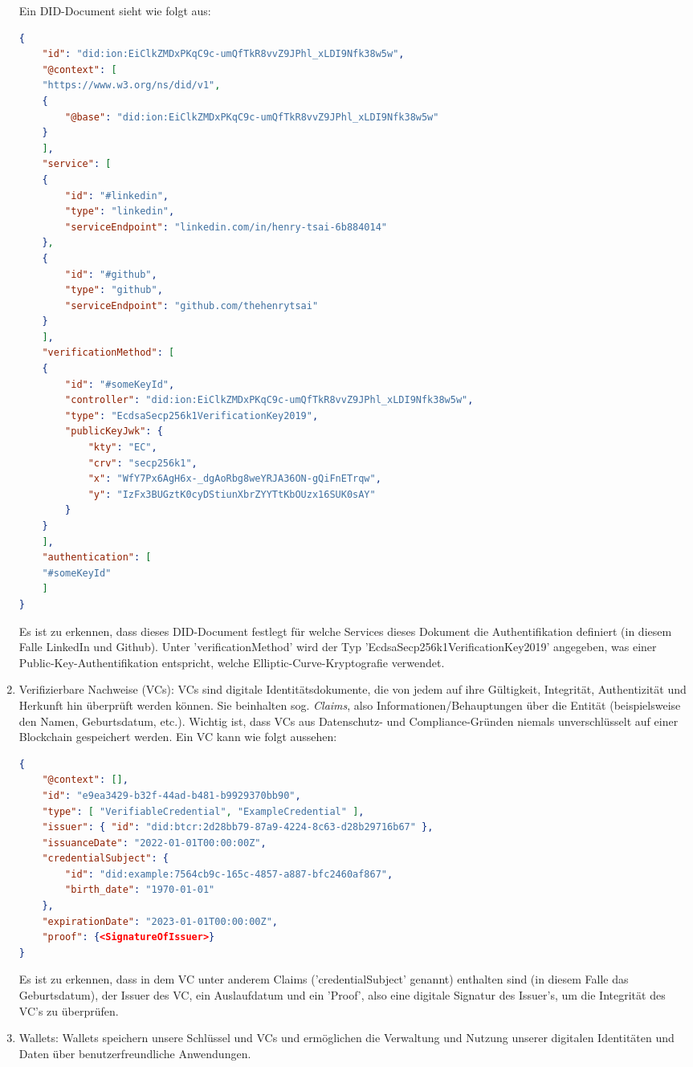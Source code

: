 \begin{enumerate}
	Ein DID-Document sieht wie folgt aus:
	\begin{lstlisting}[language=json,firstnumber=1]	
{
	"id": "did:ion:EiClkZMDxPKqC9c-umQfTkR8vvZ9JPhl_xLDI9Nfk38w5w",
	"@context": [
	"https://www.w3.org/ns/did/v1",
	{
		"@base": "did:ion:EiClkZMDxPKqC9c-umQfTkR8vvZ9JPhl_xLDI9Nfk38w5w"
	}
	],
	"service": [
	{
		"id": "#linkedin",
		"type": "linkedin",
		"serviceEndpoint": "linkedin.com/in/henry-tsai-6b884014"
	},
	{
		"id": "#github",
		"type": "github",
		"serviceEndpoint": "github.com/thehenrytsai"
	}
	],
	"verificationMethod": [
	{
		"id": "#someKeyId",
		"controller": "did:ion:EiClkZMDxPKqC9c-umQfTkR8vvZ9JPhl_xLDI9Nfk38w5w",
		"type": "EcdsaSecp256k1VerificationKey2019",
		"publicKeyJwk": {
			"kty": "EC",
			"crv": "secp256k1",
			"x": "WfY7Px6AgH6x-_dgAoRbg8weYRJA36ON-gQiFnETrqw",
			"y": "IzFx3BUGztK0cyDStiunXbrZYYTtKbOUzx16SUK0sAY"
		}
	}
	],
	"authentication": [
	"#someKeyId"
	]
}
	\end{lstlisting}
	
	Es ist zu erkennen, dass dieses DID-Document festlegt für welche Services dieses Dokument die Authentifikation definiert (in diesem Falle LinkedIn und Github). Unter 'verificationMethod' wird der Typ 'EcdsaSecp256k1VerificationKey2019' angegeben, was einer Public-Key-Authentifikation entspricht, welche Elliptic-Curve-Kryptografie verwendet.
	
	\item Verifizierbare Nachweise (VCs): VCs sind digitale Identitätsdokumente, die von jedem auf ihre Gültigkeit, Integrität, Authentizität und Herkunft hin überprüft werden können. Sie beinhalten sog. \textsl{Claims}, also Informationen/Behauptungen über die Entität (beispielsweise den Namen, Geburtsdatum, etc.). Wichtig ist, dass VCs aus Datenschutz- und Compliance-Gründen niemals unverschlüsselt auf einer Blockchain gespeichert werden. Ein VC kann wie folgt aussehen:
	
	\begin{lstlisting}[language=json,firstnumber=1]
{
	"@context": [],
	"id": "e9ea3429-b32f-44ad-b481-b9929370bb90",
	"type": [ "VerifiableCredential", "ExampleCredential" ],
	"issuer": { "id": "did:btcr:2d28bb79-87a9-4224-8c63-d28b29716b67" },
	"issuanceDate": "2022-01-01T00:00:00Z",
	"credentialSubject": {
		"id": "did:example:7564cb9c-165c-4857-a887-bfc2460af867",
		"birth_date": "1970-01-01"
	},
	"expirationDate": "2023-01-01T00:00:00Z",
	"proof": {<SignatureOfIssuer>}
}
	\end{lstlisting}
	
	Es ist zu erkennen, dass in dem VC unter anderem Claims ('credentialSubject' genannt) enthalten sind (in diesem Falle das Geburtsdatum), der Issuer des VC, ein Auslaufdatum und ein 'Proof', also eine digitale Signatur des Issuer's, um die Integrität des VC's zu überprüfen.
	
	\item Wallets: Wallets speichern unsere Schlüssel und VCs und ermöglichen die Verwaltung und Nutzung unserer digitalen Identitäten und Daten über benutzerfreundliche Anwendungen.
\end{enumerate}
